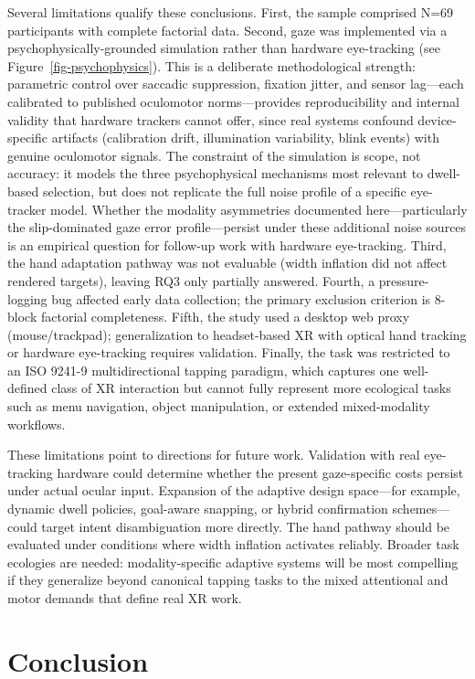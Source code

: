 \documentclass[
  11pt,
  11pt,
  letterpaper]{article}
\begin{document}
Several limitations qualify these conclusions. First, the sample
comprised N=69 participants with complete factorial data. Second, gaze
was implemented via a psychophysically-grounded simulation rather than
hardware eye-tracking (see Figure~\ref{fig-psychophysics}). This is a
deliberate methodological strength: parametric control over saccadic
suppression, fixation jitter, and sensor lag---each calibrated to
published oculomotor norms---provides reproducibility and internal
validity that hardware trackers cannot offer, since real systems
confound device-specific artifacts (calibration drift, illumination
variability, blink events) with genuine oculomotor signals. The
constraint of the simulation is scope, not accuracy: it models the three
psychophysical mechanisms most relevant to dwell-based selection, but
does not replicate the full noise profile of a specific eye-tracker
model. Whether the modality asymmetries documented here---particularly
the slip-dominated gaze error profile---persist under these additional
noise sources is an empirical question for follow-up work with hardware
eye-tracking. Third, the hand adaptation pathway was not evaluable
(width inflation did not affect rendered targets), leaving RQ3 only
partially answered. Fourth, a pressure-logging bug affected early data
collection; the primary exclusion criterion is 8-block factorial
completeness. Fifth, the study used a desktop web proxy
(mouse/trackpad); generalization to headset-based XR with optical hand
tracking or hardware eye-tracking requires validation. Finally, the task
was restricted to an ISO 9241-9 multidirectional tapping paradigm, which
captures one well-defined class of XR interaction but cannot fully
represent more ecological tasks such as menu navigation, object
manipulation, or extended mixed-modality workflows.

These limitations point to directions for future work. Validation with
real eye-tracking hardware could determine whether the present
gaze-specific costs persist under actual ocular input. Expansion of the
adaptive design space---for example, dynamic dwell policies, goal-aware
snapping, or hybrid confirmation schemes---could target intent
disambiguation more directly. The hand pathway should be evaluated under
conditions where width inflation activates reliably. Broader task
ecologies are needed: modality-specific adaptive systems will be most
compelling if they generalize beyond canonical tapping tasks to the
mixed attentional and motor demands that define real XR work.

\section{Conclusion}\label{conclusion}
\end{document}
